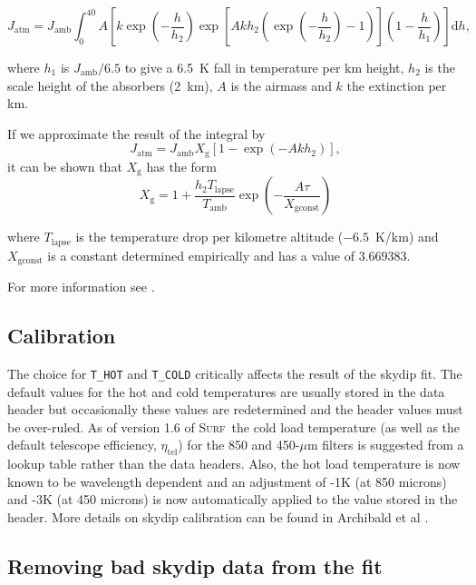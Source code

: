 \documentclass[twoside,11pt]{starlink}
\providecommand{\scusoft}          {\textsc{Surf}}
\begin{document}
\begin{equation}
J_\mathrm{atm} = J_\mathrm{amb} \int_0^{40}\! A \left[k\exp\left(-\frac{h}{h_2}
\right)\exp\left[A k h_2 \left(\exp\left(-\frac{h}{h_2}\right)-1\right)\right]
\left(1-\frac{h}{h_1}\right)\right]\mathrm{d}h,
\end{equation}

where $h_1$ is $J_\mathrm{amb}/6.5$ to give a 6.5~K fall in temperature per km
height, $h_2$ is the scale height of the absorbers (2~km), $A$ is the airmass
and $k$ the extinction per km.

If we approximate the result of the integral by
\begin{equation}
J_\mathrm{atm} = J_\mathrm{amb} X_\mathrm{g} \left[1-\exp\left(-A k h_2\right)\right],
\end{equation}
it can be shown that $X_\mathrm{g}$ has the form
\begin{equation}
X_\mathrm{g} = 1 + \frac{h_2 T_\mathrm{lapse}}{T_\mathrm{amb}}\exp\left(-\frac{A \tau}{X_\mathrm{gconst}}\right)
\end{equation}

where $T_\mathrm{lapse}$ is the temperature drop per kilometre altitude
($-6.5$~K/km) and $X_\mathrm{gconst}$ is a constant determined empirically and
has a value of 3.669383.

For more information see \cite{skydip}.

\subsection{Calibration}

The choice for \texttt{T\_HOT} and \texttt{T\_COLD} critically affects the
result of the skydip fit. The default values for the hot and cold temperatures
are usually stored in the data header but occasionally these values are
redetermined and the header values must be over-ruled.  As of version 1.6 of
\scusoft\ the cold load temperature (as well as the default telescope
efficiency, $\eta_\mathrm{tel}$) for the 850 and 450-$\mu$m filters is
suggested from a lookup table rather than the data headers. Also, the hot load
temperature is now known to be wavelength dependent and an adjustment of
-1K (at 850 microns) and -3K (at 450 microns) is now automatically applied
to the value stored in the header. More details on skydip calibration
can be found in Archibald et al \cite{scdsn2}.

\subsection{Removing bad skydip data from the fit}
\label{skydips_eg}
\end{document}

